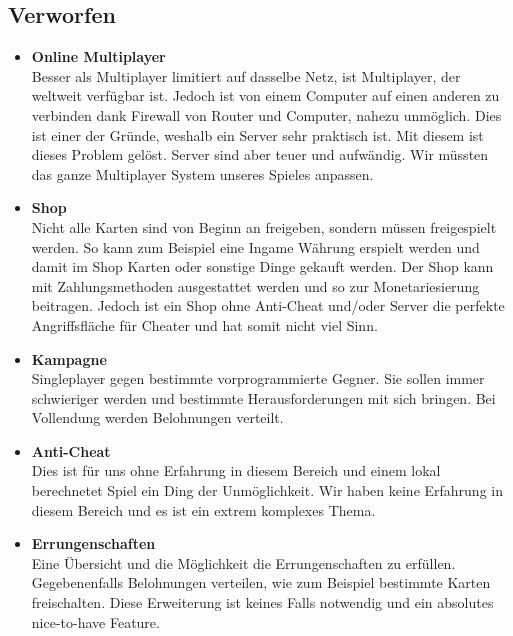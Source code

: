 \subsection*{Verworfen}
\begin{itemize}
    \item \textbf{Online Multiplayer} \\
        Besser als Multiplayer limitiert auf dasselbe Netz, ist Multiplayer, der weltweit verfügbar ist. Jedoch ist von einem Computer auf einen anderen zu
        verbinden dank Firewall von Router und Computer, nahezu unmöglich. Dies ist einer der Gründe, weshalb ein Server sehr praktisch ist. Mit diesem ist dieses
        Problem gelöst. Server sind aber teuer und aufwändig. Wir müssten das ganze Multiplayer System unseres Spieles anpassen.
    \item \textbf{Shop} \\
        Nicht alle Karten sind von Beginn an freigeben, sondern müssen freigespielt werden.
        So kann zum Beispiel eine Ingame Währung erspielt werden und damit im Shop Karten oder sonstige Dinge gekauft werden.
        Der Shop kann mit Zahlungsmethoden ausgestattet werden und so zur Monetariesierung beitragen.
        Jedoch ist ein Shop ohne Anti-Cheat und/oder Server die perfekte Angriffsfläche für Cheater und hat somit nicht viel Sinn.
    \item \textbf{Kampagne} \\
        Singleplayer gegen bestimmte vorprogrammierte Gegner. Sie sollen immer schwieriger werden und bestimmte Herausforderungen mit sich bringen.
        Bei Vollendung werden Belohnungen verteilt.
    \item \textbf{Anti-Cheat} \\
        Dies ist für uns ohne Erfahrung in diesem Bereich und einem lokal berechnetet Spiel ein Ding der Unmöglichkeit.
        Wir haben keine Erfahrung in diesem Bereich und es ist ein extrem komplexes Thema.
    \item \textbf{Errungenschaften} \\
        Eine Übersicht und die Möglichkeit die Errungenschaften zu erfüllen.
        Gegebenenfalls Belohnungen verteilen, wie zum Beispiel bestimmte Karten freischalten.
        Diese Erweiterung ist keines Falls notwendig und ein absolutes nice-to-have Feature.
\end{itemize}

